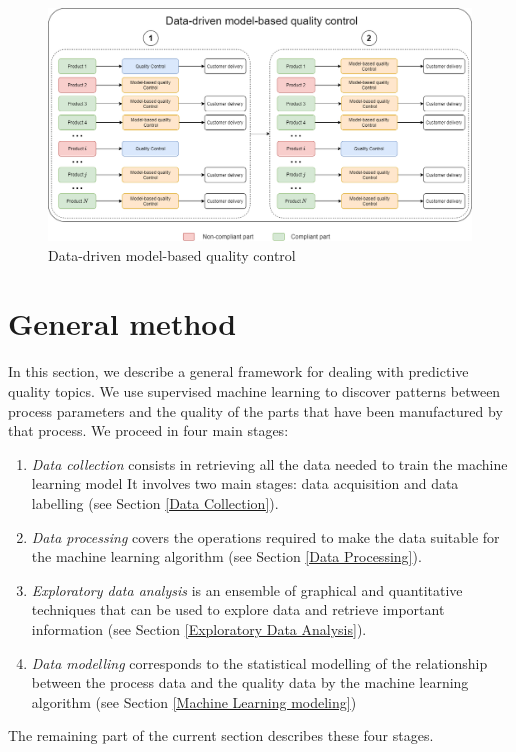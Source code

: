\begin{landscape}
\begin{figure}
\centering
\includegraphics[scale=0.50]{images/chapter_4/data_driven_model.png}
\caption{Data-driven model-based quality control}
\label{fig:model_quality_control}
\end{figure}
\end{landscape}



\section{General method} \label{Proposed Method}

In this section, we describe a general framework for dealing with predictive quality topics. We use supervised machine learning to discover patterns between process parameters and the quality of the parts that have been manufactured by that process. We proceed in four main stages:
\begin{enumerate}
    \item \textit{Data collection} consists in retrieving all the data needed to train the machine learning model It involves two main stages:  data acquisition and  data labelling (see Section \ref{Data Collection}). 
    \item \textit{Data processing} covers the operations required to make the data suitable for the machine learning algorithm (see Section \ref{Data Processing}). 
    \item \textit{Exploratory data analysis} is an ensemble of graphical and quantitative techniques that can be used to explore data and retrieve important information (see Section \ref{Exploratory Data Analysis}).
    \item \textit{Data modelling} corresponds to the statistical modelling of the relationship between the process data and the quality data by the machine learning algorithm (see Section \ref{Machine Learning modeling})
\end{enumerate}
The remaining part of the current section describes these four stages. 

